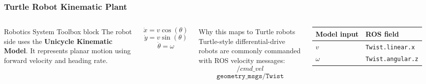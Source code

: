 \documentclass[aspectratio=169]{beamer}
\begin{document}
\begin{frame}
\frametitle{Turtle Robot Kinematic Plant}

\begin{columns}[T,totalwidth=\textwidth]
\begin{block}{Robotics System Toolbox block}
\small
The robot side uses the \textbf{Unicycle Kinematic Model}. It represents planar motion using forward velocity and heading rate.
\end{block}

\vspace{0.25cm}
\[
\dot{x}=v\cos(\theta)
\]
\[
\dot{y}=v\sin(\theta)
\]
\[
\dot{\theta}=\omega
\]

\begin{alertblock}{Why this maps to Turtle robots}
\small
Turtle-style differential-drive robots are commonly commanded with ROS velocity messages:
\[
/cmd\_vel
\]
\[
\texttt{geometry\_msgs/Twist}
\]
\end{alertblock}

\vspace{0.2cm}
\small
\begin{tabular}{ll}
\toprule
Model input & ROS field \\
\midrule
$v$ & \texttt{Twist.linear.x} \\
$\omega$ & \texttt{Twist.angular.z} \\
\bottomrule
\end{tabular}
\end{columns}

\end{frame}
\end{document}
